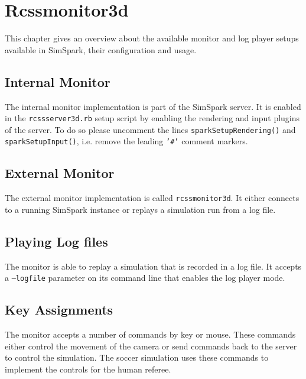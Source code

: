 \chapter{Rcssmonitor3d}
\label{cha:rcssmonitor3d}

This chapter gives an overview about the available monitor and log
player setups available in SimSpark, their configuration and usage.

\section{Internal Monitor}

The internal monitor implementation is part of the SimSpark server. It
is enabled in the \texttt{rcssserver3d.rb} setup script by enabling the
rendering and input plugins of the server. To do so please uncomment
the lines \texttt{sparkSetupRendering()} and
\texttt{sparkSetupInput()}, i.e. remove the leading \texttt{'\#'} comment markers.

\section{External Monitor}

The external monitor implementation is called
\texttt{rcssmonitor3d}. It either connects to a running SimSpark
instance or replays a simulation run from a log file.

\section{Playing Log files}

The monitor is able to replay a simulation that is recorded in a log
file. It accepts a \texttt{--logfile} parameter on its command line
that enables the log player mode.

\section{Key Assignments}

The monitor accepts a number of commands by key or mouse. These
commands either control the movement of the camera or send commands
back to the server to control the simulation. The soccer simulation
uses these commands to implement the controls for the human referee.

